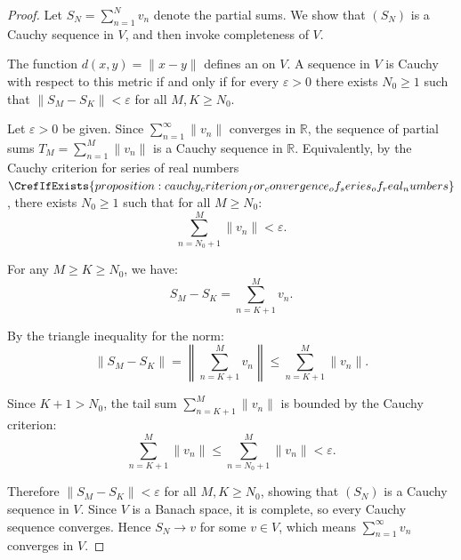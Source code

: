 \begin{proof}
    Let $S_N = \sum_{n=1}^N v_n$ denote the partial sums. We show that $(S_N)$ is a Cauchy sequence in $V$, and then invoke completeness of $V$.

    The function $d(x,y) = \|x - y\|$ defines an  on $V$. A sequence in $V$ is Cauchy with respect to this metric if and only if for every $\varepsilon > 0$ there exists $N_0 \geq 1$ such that $\|S_M - S_K\| < \varepsilon$ for all $M, K \geq N_0$.

    Let $\varepsilon > 0$ be given. Since $\sum_{n=1}^\infty \|v_n\|$ converges in $\mathbb{R}$, the sequence of partial sums $T_M = \sum_{n=1}^M \|v_n\|$ is a Cauchy sequence in $\mathbb{R}$. Equivalently, by the Cauchy criterion for series of real numbers$\CrefIfExists{proposition:cauchy_criterion_for_convergence_of_series_of_real_numbers}$, there exists $N_0 \geq 1$ such that for all $M \geq N_0$:
    $$\sum_{n=N_0+1}^M \|v_n\| < \varepsilon.$$

    For any $M \geq K \geq N_0$, we have:
    $$S_M - S_K = \sum_{n=K+1}^M v_n.$$

    By the triangle inequality for the norm:
    $$\|S_M - S_K\| = \left\|\sum_{n=K+1}^M v_n\right\| \leq \sum_{n=K+1}^M \|v_n\|.$$

    Since $K + 1 > N_0$, the tail sum $\sum_{n=K+1}^M \|v_n\|$ is bounded by the Cauchy criterion:
    $$\sum_{n=K+1}^M \|v_n\| \leq \sum_{n=N_0+1}^M \|v_n\| < \varepsilon.$$

    Therefore $\|S_M - S_K\| < \varepsilon$ for all $M, K \geq N_0$, showing that $(S_N)$ is a Cauchy sequence in $V$. Since $V$ is a Banach space, it is complete, so every Cauchy sequence converges. Hence $S_N \to v$ for some $v \in V$, which means $\sum_{n=1}^\infty v_n$ converges in $V$.
\end{proof}
